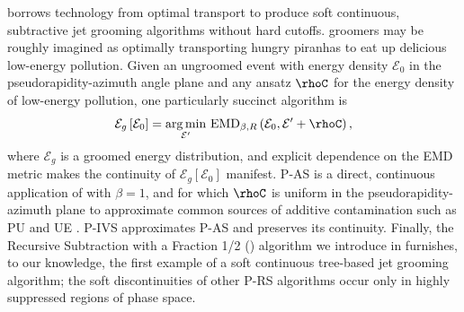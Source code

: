 \documentclass[letterpaper,11pt]{article}
\begin{document}
\PIRANHA{} borrows technology from optimal transport to produce soft continuous, subtractive jet grooming algorithms without hard cutoffs.
%
\PIRANHA{} groomers may be roughly imagined as optimally transporting hungry piranhas to eat up delicious low-energy pollution.
%
Given an ungroomed event with energy density \(\mathcal{E}_{0}\) in the pseudorapidity-azimuth angle plane and any ansatz \(\rhoC\) for the energy density of low-energy pollution, one particularly succinct \PIRANHA{} algorithm is
\begin{align}
    \mathcal{E}_g\left[\mathcal{E}_0\right]
    =
    \underset{\mathcal{E}'}{\arg \min}\ {\rm EMD}_{\beta, R}
    \left(\mathcal{E}_0, \mathcal{E}' + \rhoC\right)
    \label{eqn:simple_piranha_intro}
    ,
\end{align}
where \(\mathcal{E}_g\) is a groomed energy distribution, and explicit dependence on the EMD metric makes the continuity of \(\mathcal{E}_g\left[\mathcal{E}_0\right]\) manifest.
%
P-AS is a direct, continuous application of  with \(\beta = 1\), and for which \(\rhoC\) is uniform in the pseudorapidity-azimuth plane to approximate common sources of additive contamination such as PU and UE \cite{Soyez:2018opl,Monk:2018clo,Sjostrand:1987su,Sjostrand:2014zea,Dasgupta:2007wa,Kirchgaesser:2020poq,Moraes:2007rq,CDF:2015txs,Larkoski:2021hee,Baron:2020xoi,Marzani:2017kqd}.
%
P-IVS approximates P-AS and preserves its continuity.
%
Finally, the Recursive Subtraction with a Fraction 1/2 () algorithm we introduce in  furnishes, to our knowledge, the first example of a soft continuous tree-based jet grooming algorithm;
%
the soft discontinuities of other P-RS algorithms occur only in highly suppressed regions of phase space.
\end{document}
